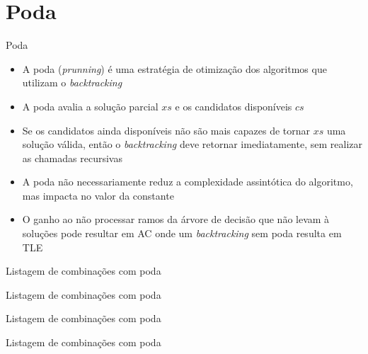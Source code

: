 \section{Poda}

\begin{frame}[fragile]{Poda}

    \begin{itemize}
        \item A poda (\textit{prunning}) é uma estratégia de otimização dos algoritmos que 
            utilizam o \textit{backtracking}

        \item A poda avalia a solução parcial $xs$ e os candidatos disponíveis $cs$

        \item Se os candidatos ainda disponíveis não são mais capazes de tornar $xs$ uma solução
            válida, então o \textit{backtracking} deve retornar imediatamente, sem realizar
            as chamadas recursivas

        \item A poda não necessariamente reduz a complexidade assintótica do algoritmo, mas 
            impacta no valor da constante 

        \item O ganho ao não processar ramos da árvore de decisão que não levam à
            soluções pode resultar em AC onde um \textit{backtracking} sem poda resulta em
            TLE
    \end{itemize}

\end{frame}

\begin{frame}[fragile]{Listagem de combinações com poda}
\end{frame}

\begin{frame}[fragile]{Listagem de combinações com poda}
\end{frame}

\begin{frame}[fragile]{Listagem de combinações com poda}
\end{frame}

\begin{frame}[fragile]{Listagem de combinações com poda}
\end{frame}
